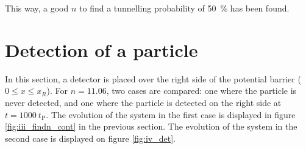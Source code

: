 \documentclass[a4paper,12pt,twoside]{article}
\begin{document}
      This way, a good $n$ to find a tunnelling probability of \SI{50}{\percent} has been found.


\newpage
\section{Detection of a particle}
\label{sec:det}

In this section, a detector is placed over the right side of the potential barrier ($0\leq x \leq x_R$). For $n=11.06$, two cases are compared: one where the particle is never detected, and one where the particle is detected on the right side at $t=1000~t_\text{P}$. The evolution of the system in the first case is displayed in figure \ref{fig:iii_findn_cont} in the previous section. The evolution of the system in the second case is displayed on figure \ref{fig:iv_det}.
\end{document}
